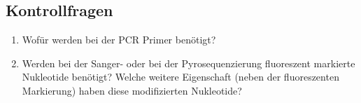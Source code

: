 \subsection{Kontrollfragen}
\begin{enumerate}
	\item Wofür werden bei der PCR Primer benötigt?
	\item Werden bei der Sanger- oder bei der Pyrosequenzierung fluoreszent markierte Nukleotide benötigt? Welche weitere Eigenschaft (neben der fluoreszenten Markierung) haben diese modifizierten Nukleotide?
\end{enumerate}
